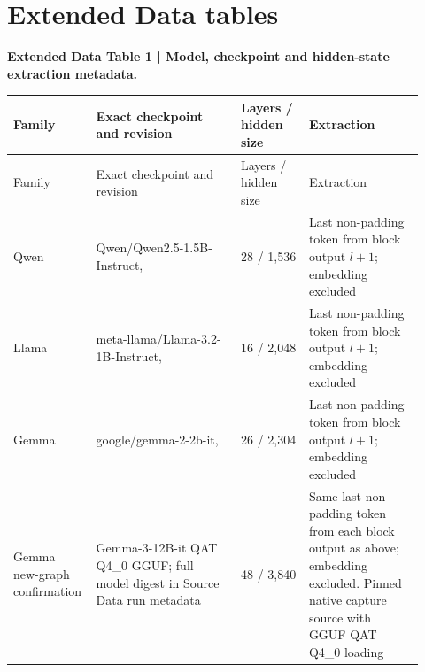 \documentclass[12pt]{article}
\begin{document}
\section*{Extended Data tables}
\noindent\textbf{Extended Data Table 1 | Model, checkpoint and hidden-state extraction metadata.}\par\medskip
\begingroup\footnotesize\setlength{\tabcolsep}{2.5pt}
\begin{longtable}{@{}L{0.150\linewidth}L{0.340\linewidth}L{0.160\linewidth}L{0.270\linewidth}@{}}
\toprule
Family & Exact checkpoint and revision & Layers / hidden size & Extraction \\
\midrule
\endfirsthead
\toprule
Family & Exact checkpoint and revision & Layers / hidden size & Extraction \\
\midrule
\endhead
Qwen & Qwen/Qwen2.5-1.5B-Instruct,  & 28 / 1,536 & Last non-padding token from block output \(l+1\); embedding excluded \\
Llama & meta-llama/Llama-3.2-1B-Instruct,  & 16 / 2,048 & Last non-padding token from block output \(l+1\); embedding excluded \\
Gemma & google/gemma-2-2b-it,  & 26 / 2,304 & Last non-padding token from block output \(l+1\); embedding excluded \\
Gemma new-graph confirmation & Gemma-3-12B-it QAT Q4\_0 GGUF; full model digest in Source Data run metadata & 48 / 3,840 & Same last non-padding token from each block output as above; embedding excluded. Pinned native capture source with GGUF QAT Q4\_0 loading \\
\bottomrule
\end{longtable}
\endgroup
\linenumbers
\end{document}
